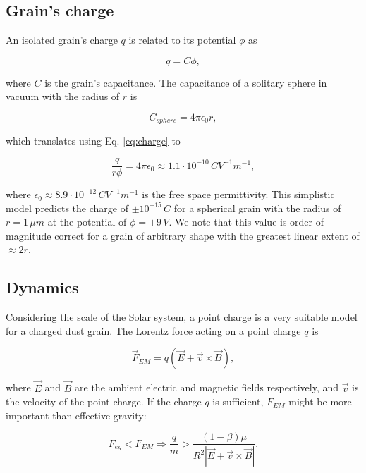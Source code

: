 \subsection{Grain's charge}

An isolated grain's charge $q$ is related to its potential $\phi$ as

\begin{equation}
    q = C \phi, \label{eq:charge}
\end{equation}

where $C$ is the grain's capacitance. The capacitance of a solitary sphere in vacuum with the radius of $r$ is 

\begin{equation}
    C_{sphere} = 4 \pi \epsilon_0 r,
\end{equation}

which translates using Eq. \ref{eq:charge} to

\begin{equation}
    \frac{q}{r \phi} = 4 \pi \epsilon_0 \approx 1.1 \cdot 10^{-10} \, \si{C V^{-1} m^{-1}},
    \label{eq:capacitance}
\end{equation}

where $\epsilon_0 \approx 8.9\cdot10^{-12} \, \si{C V^{-1} m^{-1}}$ is the free space permittivity. This simplistic model predicts the charge of $\pm 10^{-15} \, \si{C}$ for a spherical grain with the radius of $r = 1 \, \si{\mu m}$ at the potential of $\phi = \pm 9 \, \si{V}$. We note that this value is order of magnitude correct for a grain of arbitrary shape with the greatest linear extent of $\approx 2r$.

\subsection{Dynamics}

Considering the scale of the Solar system, a point charge is a very suitable model for a charged dust grain. The Lorentz force acting on a point charge $q$ is

\begin{equation}
\vec{F}_{EM} = q \left( \vec{E} + \vec{v} \times \vec{B} \right),
\end{equation}

where $\vec{E}$ and $\vec{B}$ are the ambient electric and magnetic fields respectively, and $\vec{v}$ is the velocity of the point charge. If the charge $q$ is sufficient, $F_{EM}$ might be more important than effective gravity:

\begin{equation}
    F_{eg} < F_{EM} \Rightarrow \frac{q}{m} > \frac{(1-\beta)\mu}{R^2 \left| \vec{E} + \vec{v} \times \vec{B} \right|}. \label{eq:lorentz_gravity}
\end{equation}

